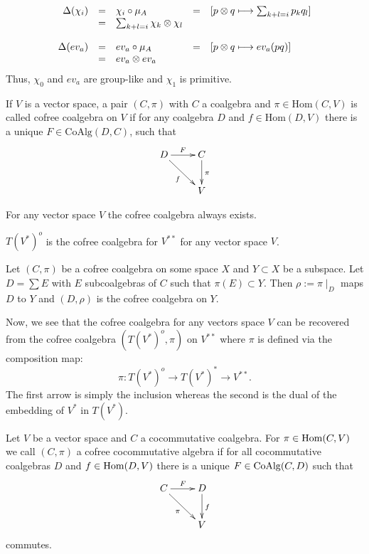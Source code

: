 $$\bao{rclcl}
\Delta(\chi_i) &=& \chi_i \circ \mu_A &=& [p \otimes q \longmapsto \sum_{k+l=i} p_k q_l]\\
&=& \sum_{k+l=i} \chi_k \otimes \chi_l&&\\
&&&&\\
\Delta(ev_a) &=& ev_a \circ \mu_A &=& \left[p \otimes q \longmapsto ev_a(p q)\right]\\
&=& ev_a \otimes ev_a\\
\ea$$
Thus, $\chi_0$ and $ev_a$ are group-like and $\chi_1$ is primitive.
\begin{defi}[Cofree]
If $V$ is a vector space, a pair $(C, \pi)$ with $C$ a coalgebra and $\pi \in \mathrm{Hom}(C,V)$ is called cofree coalgebra on $V$ if for any coalgebra $D$ and $f \in \mathrm{Hom}(D,V)$ there is a unique $F \in \mathrm{CoAlg}(D,C)$, such that 
$$\xymatrix{
D \ar[dr]_f\ar[r]^F & C \ar[d]^\pi\\
& V\\
}$$
\end{defi}
\begin{satz}
For any vector space $V$ the cofree coalgebra always exists.
\end{satz}
\bmk $T(V^\ast)^o$ is the cofree coalgebra for $V^{\ast\ast}$ for any vector space $V$.
\begin{lemm}
Let $(C,\pi)$ be a cofree coalgebra on some space $X$ and $Y \subset X$ be a subspace. Let $D = \sum E$ with
$E$ subcoalgebras of $C$ such that $\pi(E) \subset Y$. Then $\rho := \pi\mid_D$ maps $D$ to $Y$ and $(D, \rho)$ is the cofree coalgebra on $Y$.
\end{lemm}
Now, we see that the cofree coalgebra for any vectors space $V$ can be recovered from the cofree coalgebra $(T(V^\ast)^o, \pi)$ on $V^{\ast\ast}$ where $\pi$ is defined via the composition map:
$$\pi : T(V^\ast)^o \longrightarrow T(V^\ast)^\ast \longrightarrow V^{\ast\ast}.$$
The first arrow is simply the inclusion whereas the second is the dual of the embedding of $V^\ast$ in $T(V^ \ast)$.
\begin{defi}
Let $V$ be a vector space and $C$ a cocommutative coalgebra. For $\pi \in \trm{Hom}(C,V)$ we call $(C, \pi)$ a cofree cocommutative algebra if for all cocommutative coalgebras $D$ and $f \in \trm{Hom}(D,V)$ there is a 	unique $F \in \trm{CoAlg}(C,D)$ such that
$$\xymatrix{
C \ar[r]^F \ar[rd]_\pi & D\ar[d]^f\\
&V\\
}$$
commutes.
\end{defi}
